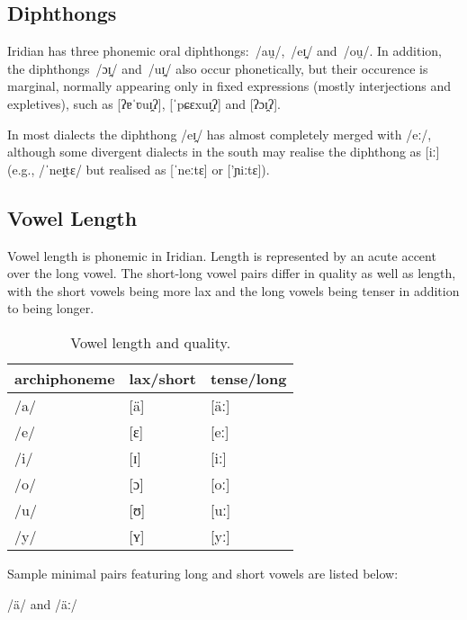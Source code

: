 \subsection{Diphthongs}
Iridian has three phonemic oral diphthongs: \,/au̯/, \,/eɪ̯/ and \,/ou̯/. In addition, the diphthongs \,/ɔɪ̯/ and \,/uɪ̯/  also occur phonetically, but their occurence is marginal, normally appearing only in fixed expressions (mostly interjections and expletives), such as  [ʔɐˈʋuɪ̯ʔ],  [ˈpɕɛxuɪ̯ʔ] and  [ʔɔɪ̯ʔ].

In most dialects the diphthong /eɪ̯/ has almost completely merged with  /eː/, although some divergent dialects in the south may realise the diphthong as [iː] (e.g.,  /ˈneɪ̯tɛ/ but realised as [ˈneːtɛ] or ['ɲiːtɛ]).

\subsection{Vowel Length}

Vowel length is phonemic in Iridian. Length is represented by an acute accent over the long vowel. The short-long vowel pairs differ in quality as well as length, with the short vowels being more lax and the long vowels being tenser in addition to being longer.

\begin{table}[h!]
	\footnotesize\sffamily
	\caption{Vowel length and quality.}
	\medskip
	\begin{tabu} to 0.7
		\toprule
		{\sc archiphoneme} & {\sc lax/short} &{\sc tense/long}\\ \midrule
		/a/	& [\"a]	& [\"aː]		\\
		/e/	& [ɛ]	& [eː]		\\
		/i/	& [ɪ]	& [iː]		\\
		/o/	& [ɔ]	& [oː]		\\
		/u/	& [ʊ] & [uː]		\\
		/y/	& [ʏ]	& [yː]		\\
		\bottomrule
	\end{tabu}
\end{table}

Sample minimal pairs featuring long and short vowels are listed below:

\pex
\a /\"a/ and /\"aː/\\

